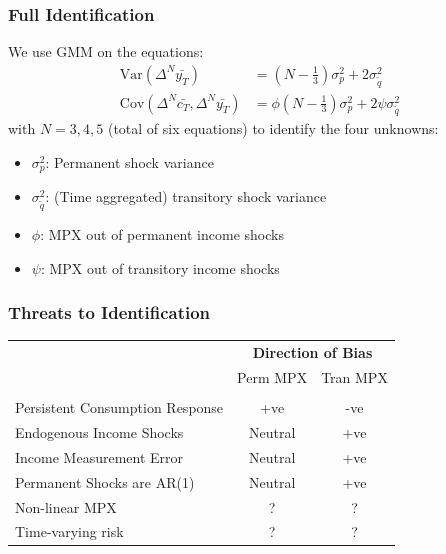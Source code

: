 \documentclass{beamer}
\begin{document}
\frame
{
	\frametitle{Full Identification}
We use GMM on the equations:
\begin{align*}
\mathrm{Var}(\Delta^N \bar{y_T} ) &=  (N-\frac{1}{3}) \sigma^2_p + 2  \sigma^2_{\tilde{q}} \\
\mathrm{Cov}(\Delta^N \bar{c_T},\Delta^N \bar{y_T} ) &= \phi (N-\frac{1}{3}) \sigma^2_p + 2 \psi \sigma^2_{\tilde{q}}
\end{align*}
with $N=3,4,5$ (total of six equations) to identify the four unknowns:
\begin{itemize}
	\item $\sigma^2_p$: Permanent shock variance
	\item $\sigma^2_{\tilde{q}}$: (Time aggregated) transitory shock variance
	\item $\phi$: MPX out of permanent income shocks
	\item $\psi$: MPX out of transitory income shocks
\end{itemize}
}
\frame
{
	\frametitle{Threats to Identification}
	\begin{minipage}{\textwidth}
		\begin{table}
			\label{table:sourcesofbias}
			\begin{tabular}{lcc}  
				\\ & \multicolumn{2}{c}{\textbf{Direction of Bias} }  
				\\ & Perm MPX & Tran MPX
				\\ \hline
				\\ Persistent Consumption Response & +ve & -ve
				\\ Endogenous Income Shocks & Neutral & +ve
				\\ Income Measurement Error &  Neutral & +ve
				\\ Permanent Shocks are AR(1) & Neutral & +ve
				\\ Non-linear MPX	& ? & ?
				\\ Time-varying risk	& ? & ?
			\end{tabular}
		\end{table}
	\end{minipage}
}
\end{document}

